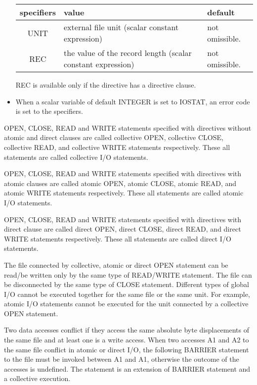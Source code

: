 \begin{itemize}
   \begin{table}[h]
    \begin{center}
     \label{tb:globalopen}
     \begin{tabular}{|c||p{90mm}|l|}
       \hline
      specifiers & value & default \\ \hline \hline
      UNIT & external file unit (scalar constant expression)
	  & not omissible. \\ \hline
      REC & the value of the record length (scalar constant expression)
	  & not omissible. \\ \hline
     \end{tabular}
    \end{center}
   \end{table}

   REC is available only if the directive has a directive clause.
   
   \item When a scalar variable of default INTEGER is set to IOSTAT, an
     error code is set to the specifiers.
	 
   \end{itemize}

   OPEN, CLOSE, READ and WRITE statements specified with \gio directives
   without atomic and direct clauses are called collective OPEN, collective
   CLOSE, collective READ, and collective WRITE statements respectively.
   These all statements are called collective I/O statements.

   OPEN, CLOSE, READ and WRITE statements specified with \gio directives
   with atomic clauses are called atomic OPEN, atomic CLOSE, atomic READ, and
   atomic WRITE statements respectively.
   These all statements are called atomic I/O statements.

   OPEN, CLOSE, READ and WRITE statements specified with \gio directives
   with direct clause are called direct OPEN, direct CLOSE, direct READ, and
   direct WRITE statements respectively.
   These all statements are called direct I/O statements.

   The file connected by collective, atomic or direct OPEN statement can
   be read/be written only by the same type of READ/WRITE statement.
   The file can be disconnected by the same type of CLOSE statement.
   Different types of global I/O cannot be executed together for the same file or the
   same unit.
   For example, atomic I/O statements cannot be executed for the unit
   connected by a collective OPEN statement.


   Two data accesses conflict if they access the same absolute byte displacements of the same file and at least one is a write access.
   When two accesses A1 and A2 to the same file conflict in atomic or direct I/O,
   the following BARRIER statement to the file must be invoked between A1 and A1, otherwise the outcome of the accesses is undefined.
   The statement is an extension of BARRIER statement and a collective execution.
   
